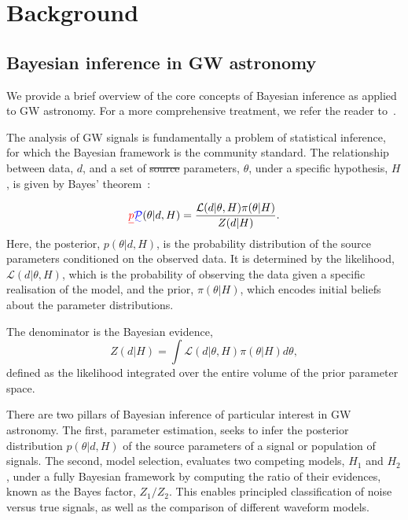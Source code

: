 \documentclass[fleqn,usenatbib]{mnras}
\providecommand{\DIFadd}[1]{{\protect\color{blue}\uwave{#1}}} %
\providecommand{\DIFdel}[1]{{\protect\color{red}\sout{#1}}}                      %
\providecommand{\DIFaddbegin}{} %
\providecommand{\DIFaddend}{} %
\providecommand{\DIFdelbegin}{} %
\providecommand{\DIFdelend}{} %
\newcommand{\DIFscaledelfig}{0.5}
\newlength{\DIFdelgraphicswidth} %
\newlength{\DIFdelgraphicsheight} %
\newcommand{\DIFaddincludegraphics}[2][]{{\color{blue}\fbox{\DIFOincludegraphics[#1]{#2}}}} %
\newcommand{\DIFdelincludegraphics}[2][]{%
\sbox{\DIFdelgraphicsbox}{\DIFOincludegraphics[#1]{#2}}%
\settoboxwidth{\DIFdelgraphicswidth}{\DIFdelgraphicsbox} %
\settoboxtotalheight{\DIFdelgraphicsheight}{\DIFdelgraphicsbox} %
\scalebox{\DIFscaledelfig}{%
\parbox[b]{\DIFdelgraphicswidth}{\usebox{\DIFdelgraphicsbox}\\[-\baselineskip] \rule{\DIFdelgraphicswidth}{0em}}\llap{\resizebox{\DIFdelgraphicswidth}{\DIFdelgraphicsheight}{%
\setlength{\unitlength}{\DIFdelgraphicswidth}%
\begin{picture}(1,1)%
\thicklines\linethickness{2pt} %
{\color[rgb]{1,0,0}\put(0,0){\framebox(1,1){}}}%
{\color[rgb]{1,0,0}\put(0,0){\line( 1,1){1}}}%
{\color[rgb]{1,0,0}\put(0,1){\line(1,-1){1}}}%
\end{picture}%
}\hspace*{3pt}}} %
} %
\DeclareRobustCommand{\DIFaddbegin}{\DIFOaddbegin \let\includegraphics\DIFaddincludegraphics} %
\DeclareRobustCommand{\DIFaddend}{\DIFOaddend \let\includegraphics\DIFOincludegraphics} %
\DeclareRobustCommand{\DIFdelbegin}{\DIFOdelbegin \let\includegraphics\DIFdelincludegraphics} %
\DeclareRobustCommand{\DIFdelend}{\DIFOaddend \let\includegraphics\DIFOincludegraphics} %
\begin{document}
\section{Background}
\label{sec:background}

\subsection{Bayesian inference in GW astronomy}
\label{sec:background_bayes}
We provide a brief overview of the core concepts of
Bayesian inference as applied to GW astronomy. For a more
comprehensive treatment, we refer the reader to~\cite{skilling, Thrane_2019, lal, bilby_paper, LIGO_guide_signalextraction}.

The analysis of GW signals is fundamentally a problem of statistical
inference, for which the Bayesian framework is the community standard.
The relationship between data, $d$, and a set of \DIFdelbegin \DIFdel{source }\DIFdelend parameters,
$\theta$, under a specific hypothesis, $H$, is given by Bayes' theorem~\citep{Bayes1763}:

\begin{equation}
    \DIFdelbegin \DIFdel{p}\DIFdelend \DIFaddbegin \DIFadd{\mathcal{P}}\DIFaddend (\theta|d, H) = \frac{\mathcal{L}(d|\theta, H) \pi(\theta|H)}{Z(d|H)}.
    \label{eq:bayes_theorem}
\end{equation}%
Here, the posterior, \DIFdelbegin \DIFdel{$p(\theta|d, H)$}\DIFdelend \DIFaddbegin \DIFadd{$\mathcal{P}(\theta|d, H)$}\DIFaddend , is the probability distribution
of the source parameters conditioned on the observed data. It is
determined by the likelihood, $\mathcal{L}(d|\theta, H)$, which is the
probability of observing the data given a specific realisation of the
model, and the prior, $\pi(\theta|H)$, which encodes initial beliefs
about the parameter distributions.

The denominator is the Bayesian evidence,
\begin{equation}
    Z(d|H) = \int \mathcal{L}(d|\theta, H) \pi(\theta|H) d\theta,
    \label{eq:evidence}
\end{equation}
defined as the likelihood integrated over the entire volume of the
prior parameter space.

There are two pillars of Bayesian inference of particular interest
in GW astronomy. The first, parameter estimation, seeks to infer 
the posterior distribution $p(\theta|d, H)$ of the source parameters of a signal or population of signals.
The second, model selection, evaluates two competing
models, $H_1$ and $H_2$, under a fully Bayesian framework by computing the ratio of
their evidences, known as the Bayes factor, $Z_1 / Z_2$. This enables
principled classification of noise versus true signals, as well as the 
comparison of different waveform models\DIFaddbegin \DIFadd{~\mbox{%
\citep{LIGO_guide_signalextraction}}\hskip0pt%
}\DIFaddend .
\end{document}
